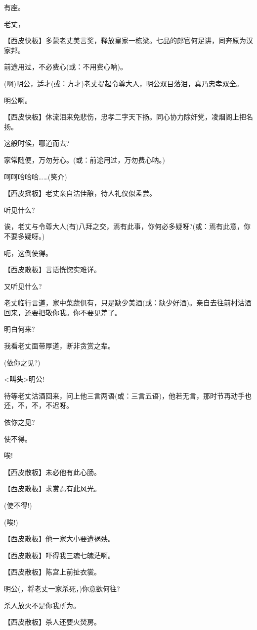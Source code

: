 有座。

老丈，

【西皮快板】多蒙老丈美言奖，释放皇家一栋梁。七品的郎官何足讲，同奔原为汉家邦。

前途用过，不必费心(或：不用费心呐)。

(啊)明公，适才(或：方才)老丈提起令尊大人，明公双目落泪，真乃忠孝双全。

明公啊。

【西皮快板】休流泪来免悲伤，忠孝二字天下扬。同心协力除奸党，凌烟阁上把名扬。

这般时候，哪道而去?

家常随便，万勿劳心。(或：前途用过，万勿费心呐。)

呵呵哈哈哈\ldots{}\ldots{}(笑介)

【西皮摇板】老丈亲自沽佳酿，待人礼仪似孟尝。

听见什么?

诶，老丈与令尊大人(有)八拜之交，焉有此事，你何必多疑呀?(或：焉有此意，你不要多疑呀。)

呃，这倒使得。

【西皮散板】言语恍惚实难详。

又听见什么?

老丈临行言道，家中菜蔬俱有，只是缺少美酒(或：缺少好酒)。亲自去往前村沽酒回来，还要把敬你我。你不要见差了。

明白何来?

我看老丈面带厚道，断非贪赏之辈。

(依你之见?)

\textless{}\textbf{叫头}\textgreater{}明公!

待等老丈沽酒回来，问上他三言两语(或：三言五语)，他若无言，那时节再动手也还，不，不，不迟呀。

依你之见?

使不得。

唉!

【西皮散板】未必他有此心肠。

【西皮散板】求赏焉有此风光。

(使不得!)

(唉!)

【西皮散板】他一家大小要遭祸殃。

【西皮散板】吓得我三魂七魄茫啊。

【西皮散板】陈宫上前扯衣裳。

明公(，将老丈一家杀死，)你意欲何往?

杀人放火不是你我所为。

【西皮散板】杀人还要火焚房。

